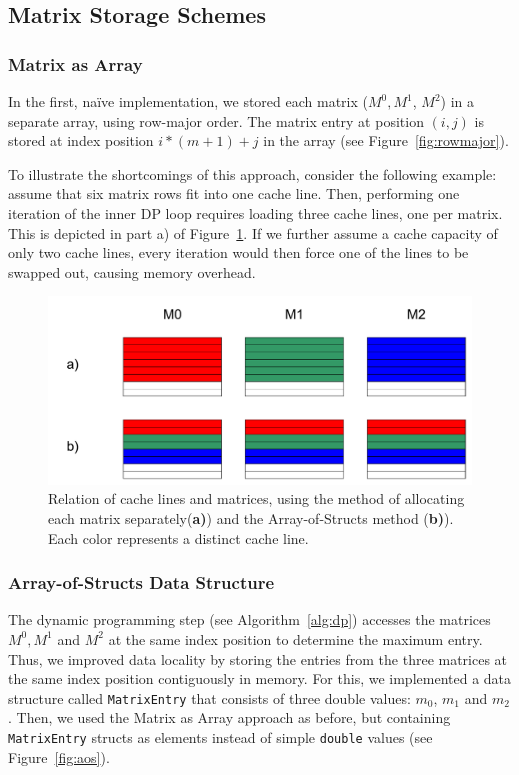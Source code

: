 \documentclass[runningheads,a4paper]{llncs}
\begin{document}
\subsection{Matrix Storage Schemes}
\label{sec:caching}

\subsubsection{Matrix as Array}
In the first, na\"ive implementation, we stored each matrix ($M^0, M^1$, $M^2$) in a separate array, using row-major order. 
The matrix entry at position $(i,j)$ is stored at index position $i*(m+1)+j$ in the array (see Figure~\ref{fig:rowmajor}).

To illustrate the shortcomings of this approach, consider the following example: assume that six matrix rows fit into one cache line. 
Then, performing one iteration of the inner DP loop requires loading three cache lines, one per matrix. 
This is depicted in part a) of Figure~\ref{fig:cachelines}.
If we further assume a cache capacity of only two cache lines, 
every iteration would then force one of the lines to be swapped out, causing memory overhead.

\begin{figure}
\centering
\includegraphics[width=\textwidth]{images/cachelines.pdf}
\caption{Relation of cache lines and matrices, using the method of allocating each matrix separately(\textbf{a)}) and the Array-of-Structs method (\textbf{b)}). 
Each color represents a distinct cache line.}
\label{fig:cachelines}
\end{figure}

\subsubsection{Array-of-Structs Data Structure}
The dynamic programming step (see Algorithm~\ref{alg:dp}) accesses the matrices $M^0, M^1$ and $M^2$ at the same index position to determine the maximum entry. 
Thus, we improved data locality by storing the entries from the three matrices at the same index position contiguously in memory. 
For this, we implemented a data structure called \texttt{MatrixEntry} that consists of three double values: \texttt{$m_0$}, \texttt{$m_1$} and \texttt{$m_2$}. 
Then, we used the Matrix as Array approach as before, but containing \texttt{MatrixEntry} structs as elements instead of simple 
\texttt{double} values (see Figure~\ref{fig:aos}). 
\end{document}
